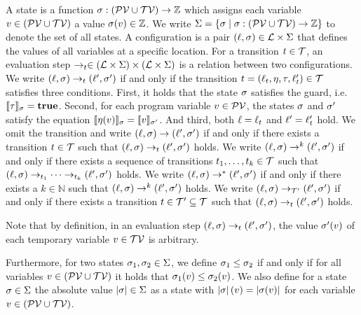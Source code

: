 \begin{definition}[Evaluation] 
  A state is a function $\sigma: (\mathcal{PV} \cup \mathcal{TV}) \rightarrow \mathbb{Z}$ which assigns each variable $v \in (\mathcal{PV} \cup \mathcal{TV})$ a value $\sigma(v) \in \mathbb{Z}$.
  We write $\Sigma = \lbrace  \sigma \mid \sigma: (\mathcal{PV} \cup \mathcal{TV}) \rightarrow \mathbb{Z} \rbrace$ to denote the set of all states.
  A configuration is a pair $(\ell, \sigma) \in \mathcal{L} \times \Sigma$ that defines the values of all variables at a specific location.
  For a transition $t \in \mathcal{T}$, an evaluation step $\rightarrow_t \in (\mathcal{L} \times \Sigma) \times (\mathcal{L} \times \Sigma)$ is a relation between two configurations.
  We write $(\ell, \sigma) \rightarrow_t (\ell', \sigma')$ if and only if the transition $t = (\ell_t, \eta, \tau, \ell_t') \in \mathcal{T}$ satisfies three conditions.
  First, it holds that the state $\sigma$ satisfies the guard, i.e. $\llbracket \tau \rrbracket_{\sigma} = \textbf{true}$.
  Second, for each program variable $v \in \mathcal{PV}$, the states $\sigma$ and $\sigma'$ satisfy the equation $\llbracket \eta(v) \rrbracket_{\sigma} = \llbracket v \rrbracket_{\sigma'}$.
  And third, both $\ell = \ell_t$ and $\ell' = \ell_t'$ hold.
  We omit the transition and write $(\ell, \sigma) \rightarrow (\ell', \sigma')$ if and only if there exists a transition $t \in \mathcal{T}$ such that $(\ell, \sigma) \rightarrow_t (\ell', \sigma')$ holds.
  We write $(\ell, \sigma) \rightarrow^k (\ell', \sigma')$ if and only if there exists a sequence of transitions $t_1, \dots, t_k \in \mathcal{T}$ such that $(\ell, \sigma) \rightarrow_{t_1} \dots \rightarrow_{t_k} (\ell', \sigma')$ holds.
  We write $(\ell, \sigma) \rightarrow^* (\ell', \sigma')$ if and only if there exists a $k \in \mathbb{N}$ such that $(\ell, \sigma) \rightarrow^k (\ell', \sigma')$ holds.
  We write $(\ell, \sigma) \rightarrow_{\mathcal{T}'} (\ell', \sigma')$ if and only if there exists a transition $t \in \mathcal{T}' \subseteq \mathcal{T}$ such that $(\ell, \sigma) \rightarrow_t (\ell', \sigma')$ holds.
\end{definition}

Note that by definition, in an evaluation step $(\ell, \sigma) \rightarrow_t (\ell', \sigma')$, the value $\sigma'(v)$ of each temporary variable $v \in \mathcal{TV}$ is arbitrary.

Furthermore, for two states $\sigma_1, \sigma_2 \in \Sigma$, we define $\sigma_1 \leq \sigma_2$ if and only if for all variables $v \in (\mathcal{PV} \cup \mathcal{TV})$ it holds that $\sigma_1(v) \leq \sigma_2(v)$.
We also define for a state $\sigma \in \Sigma$ the absolute value $\left|\sigma\right| \in \Sigma$ as a state with $\left|\sigma\right|(v) = \left|\sigma(v)\right|$ for each variable $v \in (\mathcal{PV} \cup \mathcal{TV})$.

